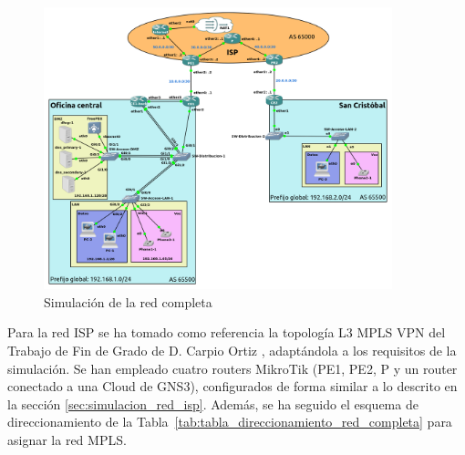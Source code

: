 \begin{figure}[htb]
	\centering
	\includegraphics[width=0.9\textwidth]{images/simulacion_entera.png}
	\caption{Simulación de la red completa}
	\label{fig:simulation_office_sancristobal}
\end{figure}

Para la red ISP se ha tomado como referencia la topología L3 MPLS VPN del Trabajo de Fin de Grado de D. Carpio Ortiz
\cite{carpio2023tfg}, adaptándola a los requisitos de la simulación. Se han empleado cuatro routers MikroTik (PE1, PE2, P y un router conectado a una Cloud de GNS3), configurados de forma similar a lo descrito en la sección \ref{sec:simulacion_red_isp}. Además, se ha seguido el esquema de direccionamiento de la Tabla~\ref{tab:tabla_direccionamiento_red_completa} para asignar la red MPLS.


